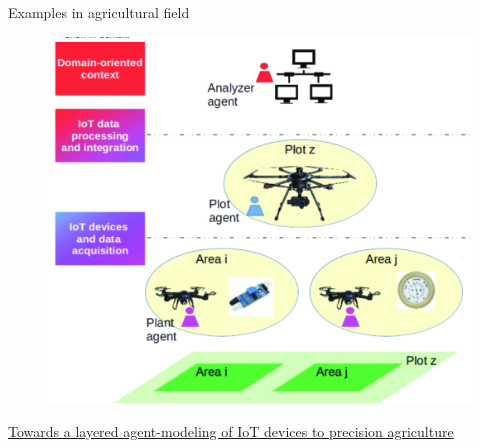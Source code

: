 \documentclass[9pt]{beamer}
\begin{document}
\begin{frame}{Examples in agricultural field}

\begin{figure}[H]
\center
\includegraphics[scale=0.32]{agr2.png}
\label{agr2}
\end{figure}

\href{https://ieeexplore.ieee.org/abstract/document/9177771}{Towards a layered agent-modeling of IoT devices to precision agriculture}

\end{frame}
\end{document}
